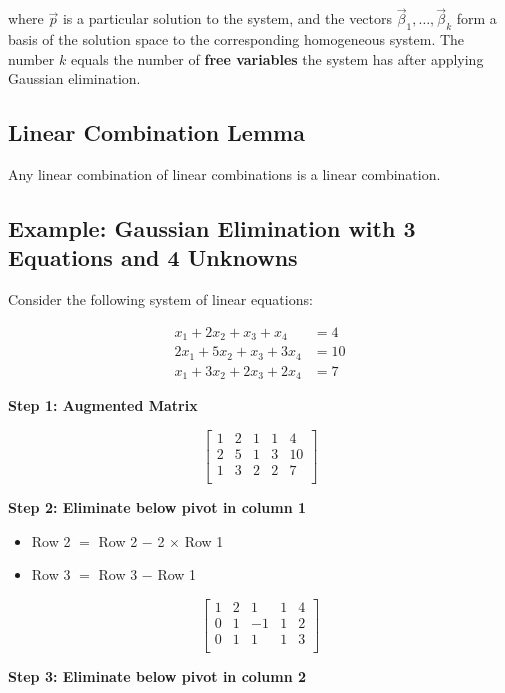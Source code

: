 where \(\vec{p}\) is a particular solution to the system, and the vectors \(\vec{\beta}_1, \ldots, \vec{\beta}_k\) form a basis of the solution space to the corresponding homogeneous system. The number \(k\) equals the number of \textbf{free variables} the system has after applying Gaussian elimination.

\subsection{Linear Combination Lemma}
Any linear combination of linear combinations is a linear combination.

\subsection{Example: Gaussian Elimination with 3 Equations and 4 Unknowns}

Consider the following system of linear equations:

\begin{align*}
	x_1 + 2x_2 + x_3 + x_4   & = 4  \\
	2x_1 + 5x_2 + x_3 + 3x_4 & = 10 \\
	x_1 + 3x_2 + 2x_3 + 2x_4 & = 7
\end{align*}

\textbf{Step 1: Augmented Matrix}

\[
	\begin{bmatrix}
		1 & 2 & 1 & 1 & 4  \\
		2 & 5 & 1 & 3 & 10 \\
		1 & 3 & 2 & 2 & 7  \\
	\end{bmatrix}
\]

\textbf{Step 2: Eliminate below pivot in column 1}

\begin{itemize}[label=\(-\)]
	\item Row 2 \(=\) Row 2 \(-\) 2 \(\times\) Row 1
	\item Row 3 \(=\) Row 3 \(-\) Row 1
\end{itemize}

\[
	\begin{bmatrix}
		1 & 2 & 1  & 1 & 4 \\
		0 & 1 & -1 & 1 & 2 \\
		0 & 1 & 1  & 1 & 3 \\
	\end{bmatrix}
\]

\textbf{Step 3: Eliminate below pivot in column 2}

